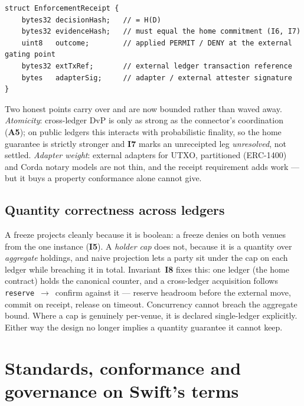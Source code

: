 \documentclass[11pt,a4paper]{article}
\newcommand{\Aref}[1]{\textbf{A#1}}
\newcommand{\Iref}[1]{\textbf{I#1}}
\begin{document}
\begin{lstlisting}[caption={The enforcement receipt closes the loop: a projected
decision is settled only when its application is proven, not when it is
sent.},captionpos=b]
struct EnforcementReceipt {
    bytes32 decisionHash;   // = H(D)
    bytes32 evidenceHash;   // must equal the home commitment (I6, I7)
    uint8   outcome;        // applied PERMIT / DENY at the external gating point
    bytes32 extTxRef;       // external ledger transaction reference
    bytes   adapterSig;     // adapter / external attester signature
}
\end{lstlisting}

Two honest points carry over and are now bounded rather than waved away.
\emph{Atomicity}: cross-ledger DvP is only as strong as the connector's
coordination (\Aref{5}); on public ledgers this interacts with probabilistic
finality, so the home guarantee is strictly stronger and \Iref{7} marks an
unreceipted leg \emph{unresolved}, not settled. \emph{Adapter weight}: external
adapters for UTXO, partitioned (ERC-1400) and Corda notary models are not thin,
and the receipt requirement adds work --- but it buys a property conformance alone
cannot give.

\subsection{Quantity correctness across ledgers}
A freeze projects cleanly because it is boolean: a freeze denies on both venues
from the one instance (\Iref{5}). A \emph{holder cap} does not, because it is a
quantity over \emph{aggregate} holdings, and naive projection lets a party sit
under the cap on each ledger while breaching it in total. Invariant~\Iref{8}
fixes this: one ledger (the home contract) holds the canonical counter, and a
cross-ledger acquisition follows \texttt{reserve}~$\rightarrow$~confirm against it
--- reserve headroom before the external move, commit on receipt, release on
timeout. Concurrency cannot breach the aggregate bound. Where a cap is genuinely
per-venue, it is declared single-ledger explicitly. Either way the design no
longer implies a quantity guarantee it cannot keep.

\section{Standards, conformance and governance on Swift's terms}
\label{sec:conformance}
\end{document}
